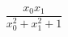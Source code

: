 \documentclass{article}
\begin{document}
\[
\frac{x_{0} x_{1}}{x_{0}^{2} + x_{1}^{2} + 1}
\]
\end{document}
